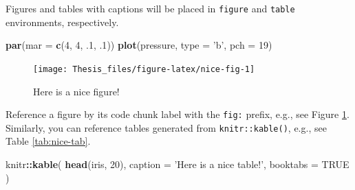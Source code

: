 \documentclass[
  12pt,
]{book}
\newenvironment{Shaded}{\begin{snugshade}}{\end{snugshade}}
\newcommand{\DataTypeTok}[1]{\textcolor[rgb]{0.13,0.29,0.53}{#1}}
\newcommand{\DecValTok}[1]{\textcolor[rgb]{0.00,0.00,0.81}{#1}}
\newcommand{\FloatTok}[1]{\textcolor[rgb]{0.00,0.00,0.81}{#1}}
\newcommand{\KeywordTok}[1]{\textcolor[rgb]{0.13,0.29,0.53}{\textbf{#1}}}
\newcommand{\NormalTok}[1]{#1}
\newcommand{\OperatorTok}[1]{\textcolor[rgb]{0.81,0.36,0.00}{\textbf{#1}}}
\newcommand{\OtherTok}[1]{\textcolor[rgb]{0.56,0.35,0.01}{#1}}
\newcommand{\StringTok}[1]{\textcolor[rgb]{0.31,0.60,0.02}{#1}}
\begin{document}
Figures and tables with captions will be placed in \texttt{figure} and \texttt{table} environments, respectively.

\begin{Shaded}
\begin{Highlighting}[]
\KeywordTok{par}\NormalTok{(}\DataTypeTok{mar =} \KeywordTok{c}\NormalTok{(}\DecValTok{4}\NormalTok{, }\DecValTok{4}\NormalTok{, }\FloatTok{.1}\NormalTok{, }\FloatTok{.1}\NormalTok{))}
\KeywordTok{plot}\NormalTok{(pressure, }\DataTypeTok{type =} \StringTok{'b'}\NormalTok{, }\DataTypeTok{pch =} \DecValTok{19}\NormalTok{)}
\end{Highlighting}
\end{Shaded}

\begin{figure}

{\centering \texttt{[image: Thesis\_files/figure-latex/nice-fig-1]} 

}

\caption{Here is a nice figure!}\label{fig:nice-fig}
\end{figure}

Reference a figure by its code chunk label with the \texttt{fig:} prefix, e.g., see Figure \ref{fig:nice-fig}. Similarly, you can reference tables generated from \texttt{knitr::kable()}, e.g., see Table \ref{tab:nice-tab}.

\begin{Shaded}
\begin{Highlighting}[]
\NormalTok{knitr}\OperatorTok{::}\KeywordTok{kable}\NormalTok{(}
  \KeywordTok{head}\NormalTok{(iris, }\DecValTok{20}\NormalTok{), }\DataTypeTok{caption =} \StringTok{'Here is a nice table!'}\NormalTok{,}
  \DataTypeTok{booktabs =} \OtherTok{TRUE}
\NormalTok{)}
\end{Highlighting}
\end{Shaded}
\end{document}
